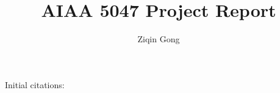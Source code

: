 \documentclass{article}
\title{AIAA 5047 Project Report}
\author{Ziqin Gong}
\date{}
\begin{document}
\maketitle

Initial citations: \citet{lieberum2024Gemma,li2024Geometry}



\end{document}
